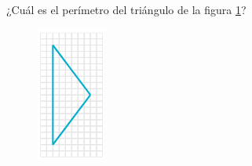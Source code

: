 
\question[25]  ¿Cuál es el perímetro del triángulo de la figura \ref{fig:peri_isos_03}?
\begin{figure}[H]
    \begin{center}
        \includegraphics[width=0.2\textwidth]{../images/peri_isos_03.png}
    \end{center}
    \caption{}
    \label{fig:peri_isos_03}
\end{figure}